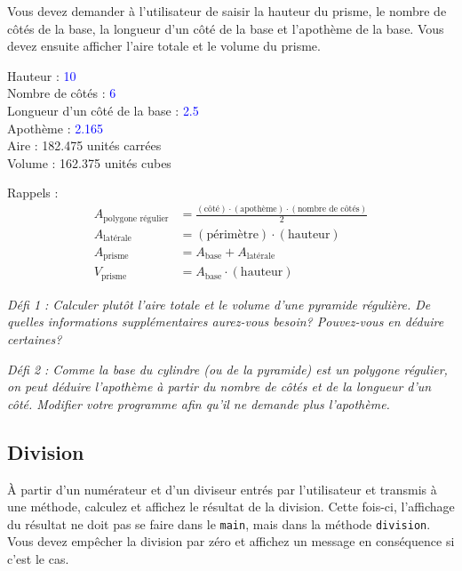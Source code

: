 \documentclass[12pt]{article}
\newenvironment{console}
	{
	\tcolorbox[title={Sortie console}, sharp corners = south, boxsep = 1.5mm]{} \tt
	}{\endtcolorbox}
\begin{document}
Vous devez demander à l'utilisateur de saisir la hauteur du prisme, le nombre de côtés de la base, la longueur d'un côté de la base et l'apothème de la base. Vous devez ensuite afficher l'aire totale et le volume du prisme. 

\begin{console}
Hauteur : \textcolor{blue}{10}\\
Nombre de côtés : \textcolor{blue}{6}\\
Longueur d'un côté de la base : \textcolor{blue}{2.5}\\
Apothème : \textcolor{blue}{2.165}\\[\baselineskip]
Aire : 182.475 unités carrées\\
Volume : 162.375 unités cubes
\end{console}

\vspace*{\baselineskip}

Rappels :
%
\begingroup
\addtolength{\jot}{1em}
\begin{align*}
	A_\text{polygone régulier} &= \frac{(\text{côté}) \cdot (\text{apothème}) \cdot (\text{nombre de côtés})}{2} \\
	A_\text{latérale} &= (\text{périmètre}) \cdot (\text{hauteur}) \\
	A_\text{prisme} &= A_\text{base} + A_\text{latérale} \\
	V_\text{prisme} &= A_\text{base} \cdot (\text{hauteur})
\end{align*}
\endgroup

\textit{Défi 1 : Calculer plutôt l'aire totale et le volume d'une pyramide régulière. De quelles informations supplémentaires aurez-vous besoin? Pouvez-vous en déduire certaines?}

\textit{Défi 2 : Comme la base du cylindre (ou de la pyramide) est un polygone régulier, on peut déduire l'apothème à partir du nombre de côtés et de la longueur d'un côté. Modifier votre programme afin qu'il ne demande plus l'apothème. }

%
%
%

\subsection{Division}

À partir d’un numérateur et d’un diviseur entrés par l’utilisateur et transmis à une méthode, calculez et affichez le résultat de la division. Cette fois-ci, l’affichage du résultat ne doit pas se faire dans le \verb|main|, mais dans la méthode \verb|division|. Vous devez empêcher la division par zéro et affichez un message en conséquence si c'est le cas.
\end{document}
